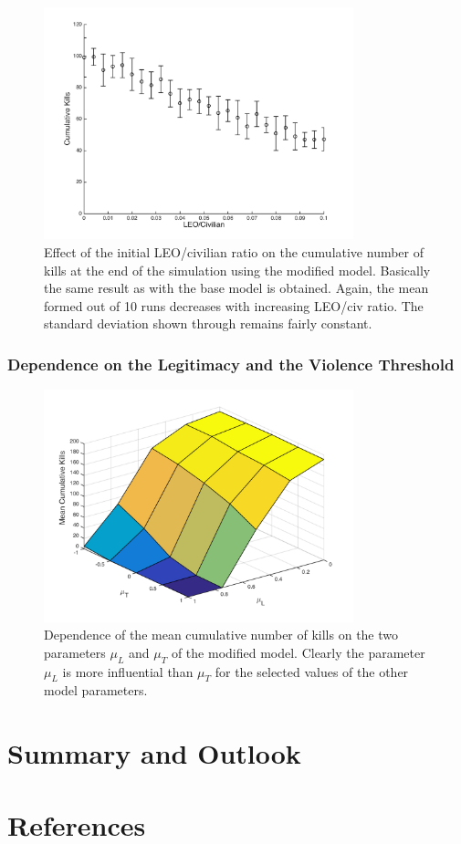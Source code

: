 \documentclass[11pt]{article}
\begin{document}
\begin{figure}[!htbp]
	\centering
		\includegraphics[width=0.80\textwidth]{../../code/modified_model/cum_kills_vs_LEO_civ.png}
	\caption{Effect of the initial LEO/civilian ratio on the cumulative number of kills at the end of the simulation using the modified model. Basically the same result as with the base model is obtained. Again, the mean formed out of 10 runs decreases with increasing LEO/civ ratio. The standard deviation shown through remains fairly constant.}
	\label{fig:LEO_civ_modified}
\end{figure}

\subsubsection{Dependence on the Legitimacy and the Violence Threshold}
\begin{figure}[!htbp]
	\centering
		\includegraphics[width=0.80\textwidth]{../../code/modified_model/L_T_mean_dep_mean.png}
	\caption{Dependence of the mean cumulative number of kills on the two parameters $\mu_L$ and $\mu_T$ of the modified model. Clearly the parameter $\mu_L$ is more influential than $\mu_T$ for the selected values of the other model parameters.}
	\label{fig:L_T_dep_mod}
\end{figure}

\section{Summary and Outlook}

\section{References}
\end{document}
